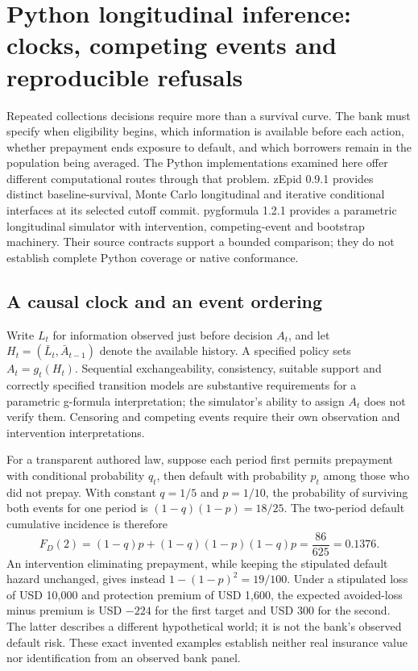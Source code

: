 \section{Python longitudinal inference: clocks, competing events and reproducible refusals}
\label{sec:exec24-longitudinal-python}
Repeated collections decisions require more than a survival curve. The bank
must specify when eligibility begins, which information is available before
each action, whether prepayment ends exposure to default, and which borrowers
remain in the population being averaged. The Python implementations examined
here offer different computational routes through that problem. zEpid 0.9.1
provides distinct baseline-survival, Monte Carlo longitudinal and iterative
conditional interfaces at its selected cutoff commit. pygformula 1.2.1
provides a parametric longitudinal simulator with intervention, competing-event
and bootstrap machinery. Their source contracts support a bounded comparison;
they do not establish complete Python coverage or native conformance.
\citep{exec24_longpy_zepid_source,exec24_longpy_pygformula_source}

\subsection{A causal clock and an event ordering}
Write $L_t$ for information observed just before decision $A_t$, and let
$H_t=(\bar L_t,\bar A_{t-1})$ denote the available history. A specified policy
sets $A_t=g_t(H_t)$. Sequential exchangeability, consistency, suitable support
and correctly specified transition models are substantive requirements for a
parametric g-formula interpretation; the simulator's ability to assign $A_t$
does not verify them. Censoring and competing events require their own
observation and intervention interpretations.

For a transparent authored law, suppose each period first permits prepayment
with conditional probability $q_t$, then default with probability $p_t$ among
those who did not prepay. With constant $q=1/5$ and $p=1/10$, the probability
of surviving both events for one period is $(1-q)(1-p)=18/25$. The two-period
default cumulative incidence is therefore
\[
 F_D(2)=(1-q)p+(1-q)(1-p)(1-q)p
       =\frac{86}{625}=0.1376.
\]
An intervention eliminating prepayment, while keeping the stipulated default
hazard unchanged, gives instead $1-(1-p)^2=19/100$. Under a stipulated loss
of USD 10,000 and protection premium of USD 1,600, the expected avoided-loss
minus premium is USD $-224$ for the first target and USD 300 for the second.
The latter describes a different hypothetical world; it is not the bank's
observed default risk. These exact invented examples establish neither real
insurance value nor identification from an observed bank panel.
\citep{exec24_longpy_reference}

